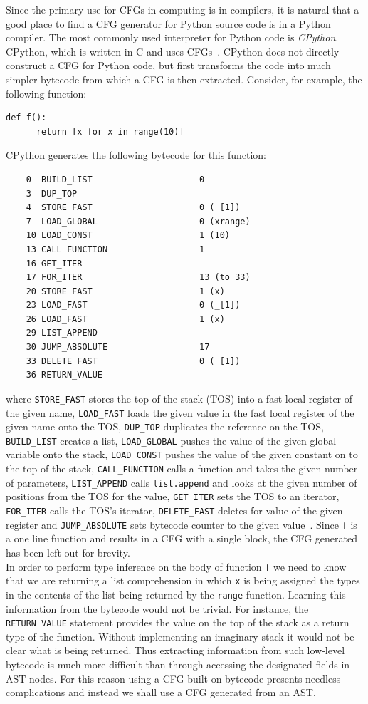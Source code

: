 \documentclass[12pt, titlepage]{article}
\begin{document}
Since the primary use for CFGs in computing is in compilers, it is natural that a good place to find a CFG generator for Python source code is in a Python compiler. The most commonly used interpreter for Python code is \textit{CPython}. CPython, which is written in C and uses CFGs~\cite{cpythonCFG}. CPython does not directly construct a CFG for Python code, but first transforms the code into much simpler bytecode from which a CFG is then extracted. Consider, for example, the following function:
\begin{lstlisting}[mathescape]
    def f():
      return [x for x in range(10)]
\end{lstlisting} 
CPython generates the following bytecode for this function:~\cite{cpythonBytecode}
\begin{verbatim}
    0  BUILD_LIST                     0
    3  DUP_TOP
    4  STORE_FAST                     0 (_[1])
    7  LOAD_GLOBAL                    0 (xrange)
    10 LOAD_CONST                     1 (10)
    13 CALL_FUNCTION                  1
    16 GET_ITER
    17 FOR_ITER                       13 (to 33)
    20 STORE_FAST                     1 (x)
    23 LOAD_FAST                      0 (_[1])
    26 LOAD_FAST                      1 (x)
    29 LIST_APPEND
    30 JUMP_ABSOLUTE                  17
    33 DELETE_FAST                    0 (_[1])
    36 RETURN_VALUE
\end{verbatim}
where \texttt{STORE\_FAST} stores the top of the stack (TOS) into a fast local register of the given name, \texttt{LOAD\_FAST} loads the given value in the fast local register of the given name onto the TOS, \texttt{DUP\_TOP} duplicates the reference on the TOS, \texttt{BUILD\_LIST} creates a list, \texttt{LOAD\_GLOBAL} pushes the value of the given global variable onto the stack, \texttt{LOAD\_CONST} pushes the value of the given constant on to the top of the stack, \texttt{CALL\_FUNCTION} calls a function and takes the given number of parameters, \texttt{LIST\_APPEND} calls \texttt{list.append} and looks at the given number of positions from the TOS for the value, \texttt{GET\_ITER} sets the TOS to an iterator, \texttt{FOR\_ITER} calls the TOS's iterator, \texttt{DELETE\_FAST} deletes for value of the given register and \texttt{JUMP\_ABSOLUTE} sets bytecode counter to the given value~\cite{disBytecode}. Since \texttt{f} is a one line function and results in a CFG with a single block, the CFG generated has been left out for brevity. \\
\indent In order to perform type inference on the body of function \texttt{f} we need to know that we are returning a list comprehension in which \texttt{x} is being assigned the types in the contents of the list being returned by the \texttt{range} function. Learning this information from the bytecode would not be trivial. For instance, the \texttt{RETURN\_VALUE} statement provides the value on the top of the stack as a return type of the function. Without implementing an imaginary stack it would not be clear what is being returned. Thus extracting information from such low-level bytecode is much more difficult than through accessing the designated fields in AST nodes. For this reason using a CFG built on bytecode presents needless complications and instead we shall use a CFG generated from an AST. \\
\end{document}
